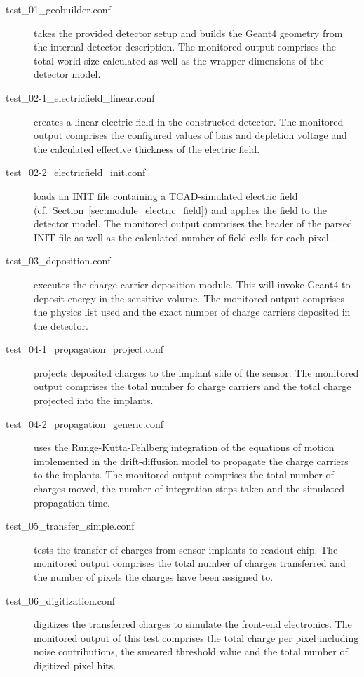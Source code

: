 \begin{description}
    \item[test\_01\_geobuilder.conf] takes the provided detector setup and builds the Geant4 geometry from the internal detector description. The monitored output comprises the total world size calculated as well as the wrapper dimensions of the detector model.
    \item[test\_02-1\_electricfield\_linear.conf] creates a linear electric field in the constructed detector. The monitored output comprises the configured values of bias and depletion voltage and the calculated effective thickness of the electric field.
    \item[test\_02-2\_electricfield\_init.conf] loads an INIT file containing a TCAD-simulated electric field (cf.\ Section~\ref{sec:module_electric_field}) and applies the field to the detector model. The monitored output comprises the header of the parsed INIT file as well as the calculated number of field cells for each pixel.
    \item[test\_03\_deposition.conf] executes the charge carrier deposition module. This will invoke Geant4 to deposit energy in the sensitive volume. The monitored output comprises the physics list used and the exact number of charge carriers deposited in the detector.
    \item[test\_04-1\_propagation\_project.conf] projects deposited charges to the implant side of the sensor. The monitored output comprises the total number fo charge carriers and the total charge projected into the implants.
    \item[test\_04-2\_propagation\_generic.conf] uses the Runge-Kutta-Fehlberg integration of the equations of motion implemented in the drift-diffusion model to propagate the charge carriers to the implants. The monitored output comprises the total number of charges moved, the number of integration steps taken and the simulated propagation time.
    \item[test\_05\_transfer\_simple.conf] tests the transfer of charges from sensor implants to readout chip. The monitored output comprises the total number of charges transferred and the number of pixels the charges have been assigned to.
    \item[test\_06\_digitization.conf] digitizes the transferred charges to simulate the front-end electronics. The monitored output of this test comprises the total charge per pixel including noise contributions, the smeared threshold value and the total number of digitized pixel hits.

\end{description}
